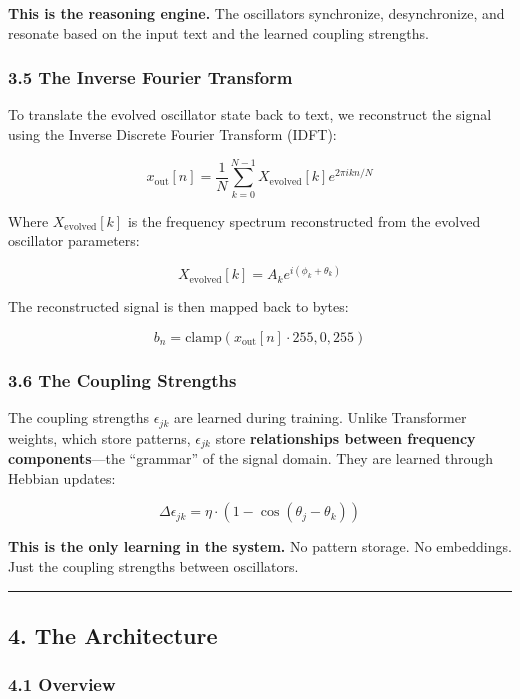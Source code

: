\documentclass[
  11pt,
  a4paper,
]{article}
\begin{document}
\textbf{This is the reasoning engine.} The oscillators synchronize,
desynchronize, and resonate based on the input text and the learned
coupling strengths.

\subsubsection{3.5 The Inverse Fourier
Transform}\label{the-inverse-fourier-transform}

To translate the evolved oscillator state back to text, we reconstruct
the signal using the Inverse Discrete Fourier Transform (IDFT):

\[
x_{\text{out}}[n] = \frac{1}{N} \sum_{k=0}^{N-1} X_{\text{evolved}}[k] e^{2\pi i k n / N}
\]

Where \(X_{\text{evolved}}[k]\) is the frequency spectrum reconstructed
from the evolved oscillator parameters:

\[
X_{\text{evolved}}[k] = A_k e^{i(\phi_k + \theta_k)}
\]

The reconstructed signal is then mapped back to bytes:

\[
b_n = \text{clamp}(x_{\text{out}}[n] \cdot 255, 0, 255)
\]

\subsubsection{3.6 The Coupling Strengths}\label{the-coupling-strengths}

The coupling strengths \(\epsilon_{jk}\) are learned during training.
Unlike Transformer weights, which store patterns, \(\epsilon_{jk}\)
store \textbf{relationships between frequency components}---the
``grammar'' of the signal domain. They are learned through Hebbian
updates:

\[
\Delta \epsilon_{jk} = \eta \cdot (1 - \cos(\theta_j - \theta_k))
\]

\textbf{This is the only learning in the system.} No pattern storage. No
embeddings. Just the coupling strengths between oscillators.

\begin{center}\rule{0.5\linewidth}{0.5pt}\end{center}

\subsection{4. The Architecture}\label{the-architecture}

\subsubsection{4.1 Overview}\label{overview}
\end{document}
